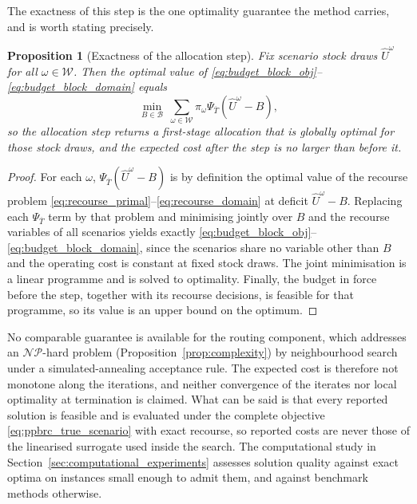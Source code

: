 \documentclass[authoryear,final,3p,times]{elsarticle}
\newtheorem{proposition}{Proposition}
\theoremstyle{definition}
\theoremstyle{plain}
\begin{document}
The exactness of this step is the one optimality guarantee the method carries,
and is worth stating precisely.

\begin{proposition}[Exactness of the allocation step]
\label{prop:ppbrc_budget_exact}
Fix scenario stock draws $\widehat U^\omega$ for all $\omega\in\mathcal W$.
Then the optimal value of
\eqref{eq:budget_block_obj}--\eqref{eq:budget_block_domain} equals
\begin{equation*}
\min_{B\in\mathcal B}\ \sum_{\omega\in\mathcal W}\pi_\omega
\Psi_{\overline T}\!\left(\widehat U^\omega-B\right),
\end{equation*}
so the allocation step returns a first-stage allocation that is globally optimal
for those stock draws, and the expected cost after the step is no larger than
before it.
\end{proposition}

\begin{proof}
For each $\omega$, $\Psi_{\overline T}(\widehat U^\omega-B)$ is by definition
the optimal value of the recourse problem
\eqref{eq:recourse_primal}--\eqref{eq:recourse_domain} at deficit
$\widehat U^\omega-B$. Replacing each $\Psi_{\overline T}$ term by that
problem and minimising jointly over $B$ and the recourse variables of all
scenarios yields exactly
\eqref{eq:budget_block_obj}--\eqref{eq:budget_block_domain}, since the
scenarios share no variable other than $B$ and the operating cost is constant
at fixed stock draws. The joint minimisation is a linear programme and is
solved to optimality. Finally, the budget in force before the step, together
with its recourse decisions, is feasible for that programme, so its value is
an upper bound on the optimum.
\end{proof}

No comparable guarantee is available for the routing component, which
addresses an $\mathcal{NP}$-hard problem
(Proposition~\ref{prop:complexity}) by neighbourhood search under a
simulated-annealing acceptance rule. The expected cost is therefore not
monotone along the iterations, and neither convergence of the iterates nor
local optimality at termination is claimed. What can be said is that every
reported solution is feasible and is evaluated under the complete objective
\eqref{eq:ppbrc_true_scenario} with exact recourse, so reported costs are
never those of the linearised surrogate used inside the search. The
computational study in Section~\ref{sec:computational_experiments} assesses
solution quality against exact optima on instances small enough to admit
them, and against benchmark methods otherwise.
\end{document}
